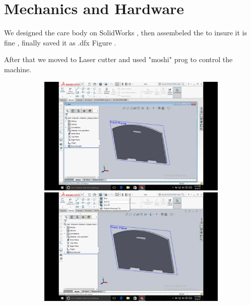 \documentclass[11pt]{report}
\begin{document}
	\section{Mechanics and Hardware}
	
		We designed the care body on SolidWorks ,  then assembeled the to insure it is fine , finally saved it as .dfx Figure .
		
		After that we moved to Laser cutter and used "moshi" prog to control the machine.
		
		\begin{figure}[]
			\begin{center}
				\begin{subfigure}[normal]{0.5\textwidth}
					\includegraphics[scale=0.13]{Ch4-Executing/Mechanical-Desin-SolidWorks}
					\caption{}
					\label{A}
					
					\includegraphics[scale=0.12]{Ch4-Executing/1}
					\caption{}
					\label{B}
			

\end{subfigure}
\end{center}
\end{figure}
\end{document}
